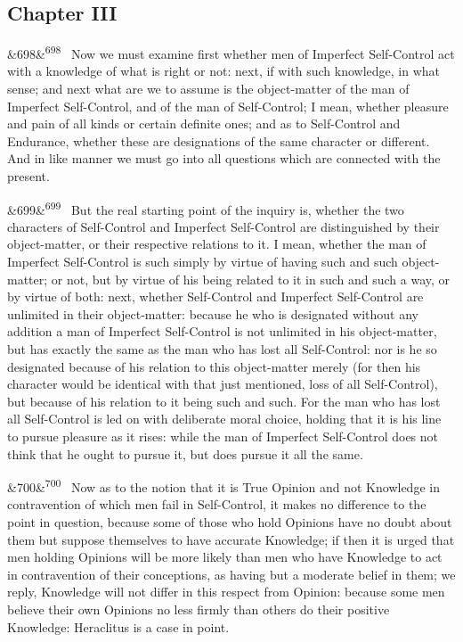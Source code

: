 \documentclass[12pt]{article}
\newcommand{\para}[1][]{\par\noindent\ifx&#1&\else\textsuperscript{\footnotesize #1}~\fi}
\begin{document}
\subsection*{Chapter III}

\para[698] Now we must examine first whether men of Imperfect Self-Control act with a knowledge of what is right or not: next, if with such knowledge, in what sense; and next what are we to assume is the object-matter of the man of Imperfect Self-Control, and of the man of Self-Control; I mean, whether pleasure and pain of all kinds or certain definite ones; and as to Self-Control and Endurance, whether these are designations of the same character or different. And in like manner we must go into all questions which are connected with the present.

\para[699] But the real starting point of the inquiry is, whether the two characters of Self-Control and Imperfect Self-Control are distinguished by their object-matter, or their respective relations to it. I mean, whether the man of Imperfect Self-Control is such simply by virtue of having such and such object-matter; or not, but by virtue of his being related to it in such and such a way, or by virtue of both: next, whether Self-Control and Imperfect Self-Control are unlimited in their object-matter: because he who is designated without any addition a man of Imperfect Self-Control is not unlimited in his object-matter, but has exactly the same as the man who has lost all Self-Control: nor is he so designated because of his relation to this object-matter merely (for then his character would be identical with that just mentioned, loss of all Self-Control), but because of his relation to it being such and such. For the man who has lost all Self-Control is led on with deliberate moral choice, holding that it is his line to pursue pleasure as it rises: while the man of Imperfect Self-Control does not think that he ought to pursue it, but does pursue it all the same.

\para[700] Now as to the notion that it is True Opinion and not Knowledge in contravention of which men fail in Self-Control, it makes no difference to the point in question, because some of those who hold Opinions have no doubt about them but suppose themselves to have accurate Knowledge; if then it is urged that men holding Opinions will be more likely than men who have Knowledge to act in contravention of their conceptions, as having but a moderate belief in them; we reply, Knowledge will not differ in this respect from Opinion: because some men believe their own Opinions no less firmly than others do their positive Knowledge: Heraclitus is a case in point.
\end{document}
